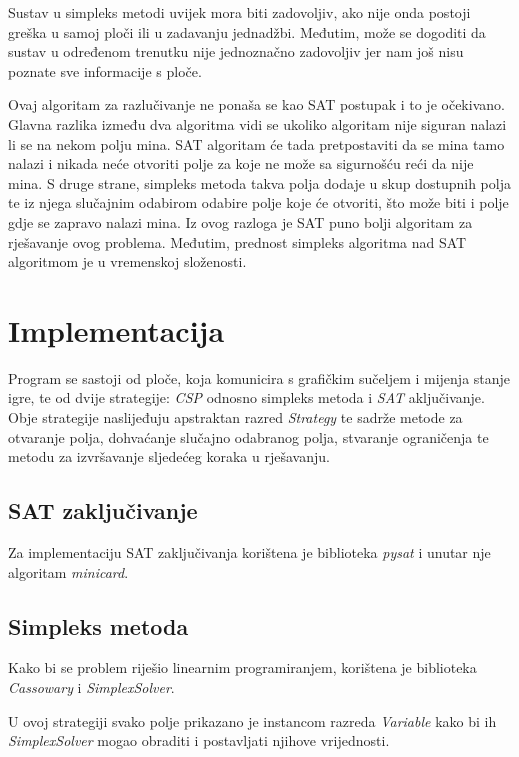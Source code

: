 \documentclass{article}
\begin{document}
Sustav u simpleks metodi uvijek mora biti zadovoljiv, ako nije onda postoji greška u samoj ploči ili u zadavanju jednadžbi. Međutim, može se dogoditi da sustav u određenom trenutku nije jednoznačno zadovoljiv jer nam još nisu poznate sve informacije s ploče.

Ovaj algoritam za razlučivanje ne ponaša se kao SAT postupak i to je očekivano. Glavna razlika
između dva algoritma vidi se ukoliko algoritam nije siguran nalazi li se na nekom polju
mina. SAT algoritam će tada pretpostaviti da se mina tamo nalazi i nikada neće otvoriti polje za koje ne može sa sigurnošću reći da nije mina. S druge strane, simpleks metoda takva polja dodaje u skup dostupnih polja te iz njega slučajnim odabirom odabire polje koje će otvoriti, što može biti i polje gdje se zapravo nalazi mina. Iz ovog razloga je SAT puno bolji algoritam za rješavanje
ovog problema. Međutim, prednost simpleks algoritma nad SAT algoritmom je u vremenskoj složenosti.

\section{Implementacija}

Program se sastoji od ploče, koja komunicira s grafičkim sučeljem i mijenja stanje igre, te od dvije strategije: \textit{CSP} odnosno simpleks metoda i \textit{SAT} aključivanje.
Obje strategije naslijeđuju apstraktan razred \textit{Strategy} te sadrže metode za otvaranje polja, dohvaćanje slučajno odabranog polja, stvaranje ograničenja te metodu za izvršavanje sljedećeg koraka u rješavanju.

\subsection{SAT zaključivanje}

Za implementaciju SAT zaključivanja korištena je biblioteka \textit{pysat} i unutar nje algoritam \textit{minicard}.  

\subsection{Simpleks metoda}

Kako bi se problem riješio linearnim programiranjem, korištena je biblioteka \textit{Cassowary} i \textit{SimplexSolver}. 

U ovoj strategiji svako polje prikazano je instancom razreda \textit{Variable} kako bi ih \textit{SimplexSolver} mogao obraditi i postavljati njihove vrijednosti.
\end{document}
